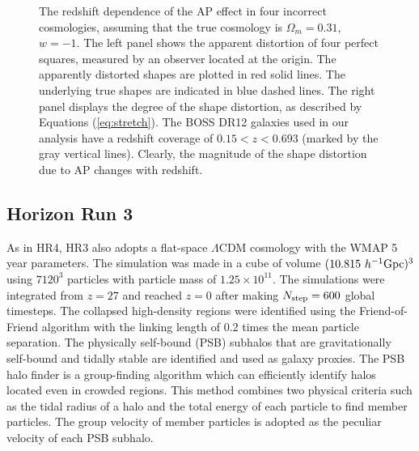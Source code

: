 \documentclass[iop]{emulateapj}
\newcommand{\hMsun}{{\ifmmode{h^{-1}{\rm
        {M_{\odot}}}}\else{$h^{-1}{\rm{M_{\odot}}}$~}\fi}}
\begin{document}
\begin{figure}
   \caption{\label{fig_xy}
   The redshift dependence of the AP effect in four incorrect cosmologies,
   assuming that the true cosmology is $\Omega_m=0.31$, $w=-1$.
   The left panel shows the apparent distortion of four perfect squares,
   measured by an observer located at the origin.
   The apparently distorted shapes are plotted in red solid lines.
   The underlying true shapes are indicated in blue dashed lines.
   The right panel displays the degree of the shape distortion, as described by Equations (\ref{eq:stretch}).
   The BOSS DR12 galaxies used in our analysis have a redshift coverage of $0.15 < z < 0.693$ (marked 
   by the gray vertical lines). Clearly, the magnitude of the shape distortion due to AP changes with redshift.
   }
\end{figure}



\subsection{Horizon Run 3}

As in HR4, HR3 also adopts a flat-space $\Lambda$CDM cosmology with the WMAP 5 year parameters.
The simulation was made in a cube of volume $(10.815\  h^{-1}{\rm{Gpc}})^3$
using $7120^3$ particles with particle mass of $1.25\times 10^{11}$\hMsun.
The simulations were integrated from $z=27$ and reached $z=0$ after making $N_{\rm step}=600$ global timesteps.
The collapsed high-density regions were identified using the Friend-of-Friend algorithm with the linking length of 0.2 times the mean particle separation.
The physically self-bound (PSB) subhalos that are gravitationally self-bound and tidally stable \citep{kim and park 2006} 
are identified and used as galaxy proxies.
The PSB halo finder is a group-finding algorithm which can efficiently identify halos located even in crowded regions. 
This method combines two physical criteria such as the tidal radius of a halo and the total energy of each particle to find member particles.
The group velocity of member particles is adopted as the peculiar velocity of each PSB subhalo.
\end{document}
